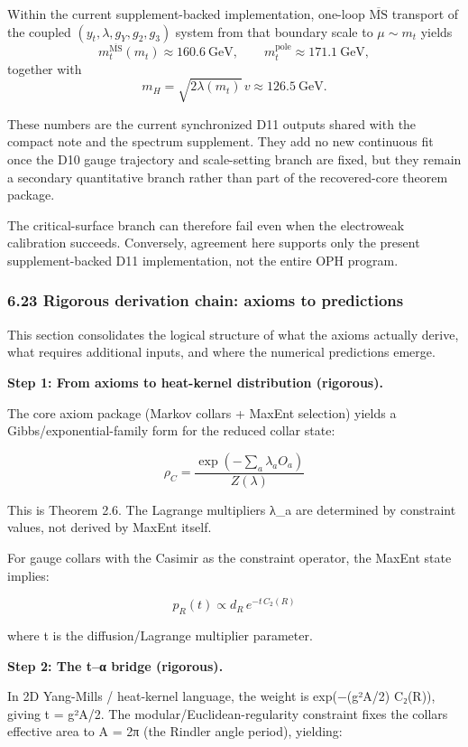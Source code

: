 Within the current supplement-backed implementation, one-loop \(\overline{\mathrm{MS}}\) transport of the coupled \((y_t,\lambda,g_Y,g_2,g_3)\) system from that boundary scale to \(\mu\sim m_t\) yields
\[
m_t^{\overline{\mathrm{MS}}}(m_t)\approx 160.6\ \mathrm{GeV},
\qquad
m_t^{\mathrm{pole}}\approx 171.1\ \mathrm{GeV},
\]
together with
\[
m_H=\sqrt{2\lambda(m_t)}\,v\approx 126.5\ \mathrm{GeV}.
\]

These numbers are the current synchronized D11 outputs shared with the compact note and the spectrum supplement. They add no new continuous fit once the D10 gauge trajectory and scale-setting branch are fixed, but they remain a secondary quantitative branch rather than part of the recovered-core theorem package.

The critical-surface branch can therefore fail even when the electroweak calibration succeeds. Conversely, agreement here supports only the present supplement-backed D11 implementation, not the entire OPH program.

\subsubsection{6.23 Rigorous derivation chain: axioms to predictions}\label{623-rigorous-derivation-chain-axioms-to-predictions}

This section consolidates the logical structure of what the axioms actually derive, what requires additional inputs, and where the numerical predictions emerge.

\textbf{Step 1: From axioms to heat-kernel distribution (rigorous).}

The core axiom package (Markov collars + MaxEnt selection) yields a Gibbs/exponential-family form for the reduced collar state:

\[
\rho_C = \frac{\exp(-\sum_a \lambda_a O_a)}{Z(\lambda)}
\]

This is Theorem 2.6. The Lagrange multipliers λ\_a are determined by constraint values, not derived by MaxEnt itself.

For gauge collars with the Casimir as the constraint operator, the MaxEnt state implies:

\[
p_R(t) \propto d_R \, e^{-t \, C_2(R)}
\]

where t is the diffusion/Lagrange multiplier parameter.

\textbf{Step 2: The t--α bridge (rigorous).}

In 2D Yang-Mills / heat-kernel language, the weight is exp(−(g²A/2) C₂(R)), giving t = g²A/2. The modular/Euclidean-regularity constraint fixes the collar\textquotesingle s effective area to A = 2π (the Rindler angle period), yielding:

